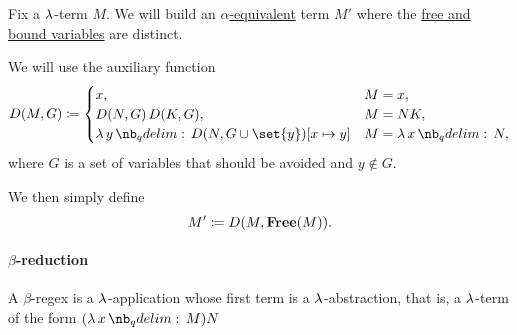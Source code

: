 \begin{algorithm}\label{alg:alpha_equivalent_term_with_distinct_variables}
  Fix a \( \mathrm{\lambda} \)-term \( M \). We will build an \hyperref[def:lambda_term_alpha_equivalence]{\( \alpha \)-equivalent} term \( M' \) where the \hyperref[def:lambda_variable_freeness]{free and bound variables} are distinct.

  We will use the auxiliary function
  \begin{equation*}
    D(M, G) \coloneqq \begin{cases}
      x,                                          &M = x, \\
      D(N, G) \thinspace D(K, G),                 &M = NK, \\
      \qabs y D(N, G \cup \set{ y })[x \mapsto y] &M = \qabs x N,
    \end{cases}
  \end{equation*}
  where \( G \) is a set of variables that should be avoided and \( y \not\in G \).

  We then simply define
  \begin{equation*}
    M' \coloneqq D(M, \operatorname{\mathbf{Free}}(M)).
  \end{equation*}
\end{algorithm}

\paragraph{\( \beta \)-reduction}

\begin{definition}\label{def:beta_redex}
  A \( \beta \)-regex is a \( \mathrm{\lambda} \)-application whose first term is a \( \mathrm{\lambda} \)-abstraction, that is, a \( \mathrm{\lambda} \)-term of the form \( (\qabs x M) N \)
\end{definition}
